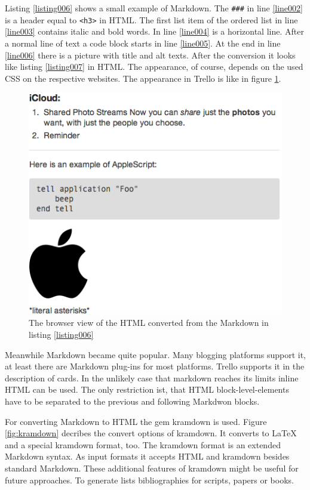 Listing \ref{listing006} shows a small example of Markdown. The \lstinline{###} in line \ref{line002} is a header equal to \lstinline{<h3>} in HTML. The first list item of the ordered list in line \ref{line003} contains italic and bold words. In line \ref{line004} is a horizontal line. After a normal line of text a code block starts in line \ref{line005}. At the end in line \ref{line006} there is a picture with title and alt texts. After the conversion it looks like listing \ref{listing007} in HTML. The appearance, of course, depends on the used CSS on the respective websites. The appearance in Trello is like in figure \ref{fig:markdown-result}.

\begin{figure}[htb]
\centering
\includegraphics[scale=0.6]{figures/markdown-result}
\caption{The browser view of the HTML converted from the Markdown in listing \ref{listing006}}
\label{fig:markdown-result}
\end{figure}

Meanwhile Markdown became quite popular. Many blogging platforms support it, at least there are Markdown plug-ins for most platforms. Trello supports it in the description of cards. In the unlikely case that markdown reaches its limits inline HTML can be used. The only restriction ist, that HTML block-level-elements have to be separated to the previous and following Markdwon blocks.

For converting Markdown to HTML the gem kramdown is used. Figure \ref{fig:kramdown} decribes the convert options of kramdown. It converts to LaTeX and a special kramdown format, too. The kramdown format is an extended Markdown syntax. As input formats it accepts HTML and kramdown besides standard Markdown. \cite{kramdown} These additional features of kramdown might be useful for future approaches. To generate lists bibliographies for scripts, papers or books.

